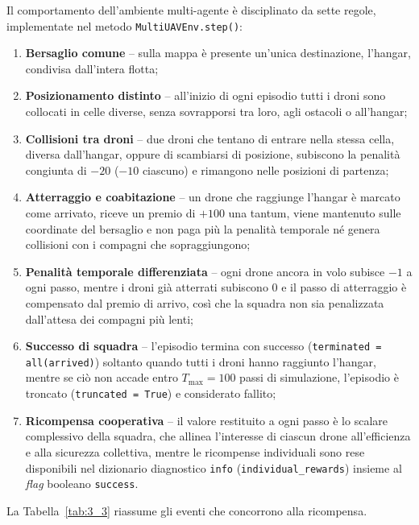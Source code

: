 \documentclass[12pt,a4paper,twoside]{report}
\begin{document}
Il comportamento dell'ambiente multi-agente è disciplinato da sette regole, implementate nel metodo \texttt{MultiUAVEnv.step()}:
\begin{enumerate}
    \item \textbf{Bersaglio comune} -- sulla mappa è presente un'unica destinazione, l'hangar, condivisa dall'intera flotta;
    \item \textbf{Posizionamento distinto} -- all'inizio di ogni episodio tutti i droni sono collocati in celle diverse, senza sovrapporsi tra loro, agli ostacoli o all'hangar;
    \item \textbf{Collisioni tra droni} -- due droni che tentano di entrare nella stessa cella, diversa dall'hangar, oppure di scambiarsi di posizione, subiscono la penalità congiunta di $-20$ ($-10$ ciascuno) e rimangono nelle posizioni di partenza;
    \item \textbf{Atterraggio e coabitazione} -- un drone che raggiunge l'hangar è marcato come arrivato, riceve un premio di $+100$ una tantum, viene mantenuto sulle coordinate del bersaglio e non paga più la penalità temporale né genera collisioni con i compagni che sopraggiungono;
    \newpage
    \item \textbf{Penalità temporale differenziata} -- ogni drone ancora in volo subisce $-1$ a ogni passo, mentre i droni già atterrati subiscono $0$ e il passo di atterraggio è compensato dal premio di arrivo, così che la squadra non sia penalizzata dall'attesa dei compagni più lenti;
    \item \textbf{Successo di squadra} -- l'episodio termina con successo (\allowbreak\texttt{terminated = \allowbreak all(\allowbreak arrived)}) soltanto quando tutti i droni hanno raggiunto l'hangar, mentre se ciò non accade entro $T_{\max} = 100$ passi di simulazione, l'episodio è troncato (\texttt{truncated = \allowbreak True}) e considerato fallito;
    \item \textbf{Ricompensa cooperativa} -- il valore restituito a ogni passo è lo scalare complessivo della squadra, che allinea l'interesse di ciascun drone all'efficienza e alla sicurezza collettiva, mentre le ricompense individuali sono rese disponibili nel dizionario diagnostico \texttt{info} (\texttt{individual\_\allowbreak rewards}) insieme al \emph{flag} booleano \texttt{success}.
\end{enumerate}
La Tabella~\ref{tab:3_3} riassume gli eventi che concorrono alla ricompensa.
\end{document}
